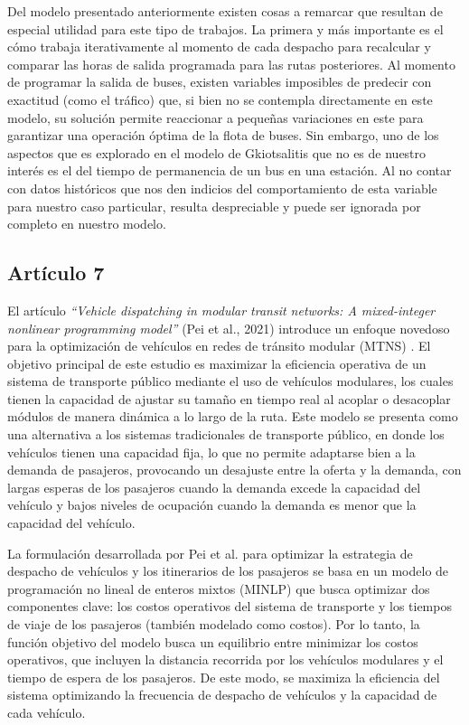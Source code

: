 \documentclass[preprint,11pt]{elsarticle}
\begin{document}
Del modelo presentado anteriormente existen cosas a remarcar que resultan de especial utilidad para este tipo de trabajos. La primera y más importante es el cómo trabaja iterativamente al momento de cada despacho para recalcular y comparar las horas de salida programada para las rutas posteriores. Al momento de programar la salida de buses, existen variables imposibles de predecir con exactitud (como el tráfico) que, si bien no se contempla directamente en este modelo, su solución permite reaccionar a pequeñas variaciones en este para garantizar una operación óptima de la flota de buses. Sin embargo, uno de los aspectos que es explorado en el modelo de Gkiotsalitis que no es de nuestro interés es el del tiempo de permanencia de un bus en una estación. Al no contar con datos históricos que nos den indicios del comportamiento de esta variable para nuestro caso particular, resulta despreciable y puede ser ignorada por completo en nuestro modelo.

\subsection*{Artículo 7}

El artículo \textit{“Vehicle dispatching in modular transit networks: A mixed-integer nonlinear programming model”} (Pei et al., 2021) introduce un enfoque novedoso para la optimización de vehículos en redes de tránsito modular (MTNS) \parencite{pei2021}. El objetivo principal de este estudio es maximizar la eficiencia operativa de un sistema de transporte público mediante el uso de vehículos modulares, los cuales tienen la capacidad de ajustar su tamaño en tiempo real al acoplar o desacoplar módulos de manera dinámica a lo largo de la ruta. Este modelo se presenta como una alternativa a los sistemas tradicionales de transporte público, en donde los vehículos tienen una capacidad fija, lo que no permite adaptarse bien a la demanda de pasajeros, provocando un desajuste entre la oferta y la demanda, con largas esperas de los pasajeros cuando la demanda excede la capacidad del vehículo y bajos niveles de ocupación cuando la demanda es menor que la capacidad del vehículo.

La formulación desarrollada por Pei et al. para optimizar la estrategia de despacho de vehículos y los itinerarios de los pasajeros se basa en un modelo de programación no lineal de enteros mixtos (MINLP) que busca optimizar dos componentes clave: los costos operativos del sistema de transporte y los tiempos de viaje de los pasajeros (también modelado como costos). Por lo tanto, la función objetivo del modelo busca un equilibrio entre minimizar los costos operativos, que incluyen la distancia recorrida por los vehículos modulares y el tiempo de espera de los pasajeros. De este modo, se maximiza la eficiencia del sistema optimizando la frecuencia de despacho de vehículos y la capacidad de cada vehículo.
\end{document}
